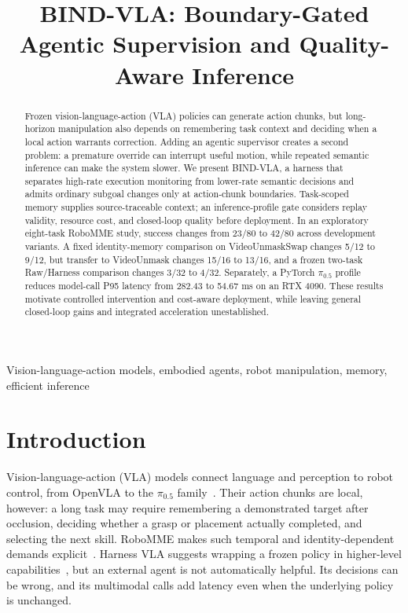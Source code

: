 \documentclass[letterpaper,10pt,conference]{ieeeconf}
\begin{document}
\title{BIND-VLA: Boundary-Gated Agentic Supervision and Quality-Aware Inference}
\author{} %
\maketitle

\begin{abstract}
Frozen vision-language-action (VLA) policies can generate action chunks, but long-horizon manipulation also depends on remembering task context and deciding when a local action warrants correction. Adding an agentic supervisor creates a second problem: a premature override can interrupt useful motion, while repeated semantic inference can make the system slower. We present BIND-VLA, a harness that separates high-rate execution monitoring from lower-rate semantic decisions and admits ordinary subgoal changes only at action-chunk boundaries. Task-scoped memory supplies source-traceable context; an inference-profile gate considers replay validity, resource cost, and closed-loop quality before deployment. In an exploratory eight-task RoboMME study, success changes from 23/80 to 42/80 across development variants. A fixed identity-memory comparison on VideoUnmaskSwap changes 5/12 to 9/12, but transfer to VideoUnmask changes 15/16 to 13/16, and a frozen two-task Raw/Harness comparison changes 3/32 to 4/32. Separately, a PyTorch $\pi_{0.5}$ profile reduces model-call P95 latency from 282.43 to 54.67 ms on an RTX 4090. These results motivate controlled intervention and cost-aware deployment, while leaving general closed-loop gains and integrated acceleration unestablished.
\end{abstract}

\begin{keywords}
Vision-language-action models, embodied agents, robot manipulation, memory, efficient inference
\end{keywords}

\section{Introduction}
\label{sec:intro}
Vision-language-action (VLA) models connect language and perception to robot control, from OpenVLA to the $\pi_{0.5}$ family~\cite{openvla,pi05}. Their action chunks are local, however: a long task may require remembering a demonstrated target after occlusion, deciding whether a grasp or placement actually completed, and selecting the next skill. RoboMME makes such temporal and identity-dependent demands explicit~\cite{robomme}. Harness VLA suggests wrapping a frozen policy in higher-level capabilities~\cite{harnessvla}, but an external agent is not automatically helpful. Its decisions can be wrong, and its multimodal calls add latency even when the underlying policy is unchanged.
\end{document}
